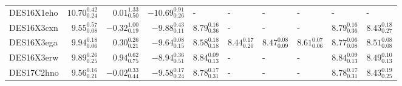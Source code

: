 \documentclass[fleqn,usenatbib,]{mnras}
\begin{document}
\begin{table}
\begin{threeparttable}
\begin{tabular}{lrrrllllll}
DES16X1eho  &  $10.70 _{\scriptscriptstyle 0.24} ^{\scriptscriptstyle 0.42}$ &   $0.01 _{\scriptscriptstyle 0.50} ^{\scriptscriptstyle 1.33}$ &  $-10.69 _{\scriptscriptstyle 0.26} ^{\scriptscriptstyle 0.91}$ &                                                             - &                                                             - &                                                             - &                                                             - &                                                             - &                                                             - \\
DES16X3cxn  &   $9.55 _{\scriptscriptstyle 0.08} ^{\scriptscriptstyle 0.57}$ &  $-0.32 _{\scriptscriptstyle 0.19} ^{\scriptscriptstyle 1.00}$ &   $-9.88 _{\scriptscriptstyle 0.11} ^{\scriptscriptstyle 0.43}$ &  $8.79 _{\scriptscriptstyle 0.36} ^{\scriptscriptstyle 0.16}$ &                                                             - &                                                             - &                                                             - &  $8.79 _{\scriptscriptstyle 0.36} ^{\scriptscriptstyle 0.16}$ &  $8.43 _{\scriptscriptstyle 0.27} ^{\scriptscriptstyle 0.18}$ \\
DES16X3ega  &   $9.94 _{\scriptscriptstyle 0.06} ^{\scriptscriptstyle 0.18}$ &   $0.30 _{\scriptscriptstyle 0.21} ^{\scriptscriptstyle 0.26}$ &   $-9.64 _{\scriptscriptstyle 0.15} ^{\scriptscriptstyle 0.08}$ &  $8.58 _{\scriptscriptstyle 0.18} ^{\scriptscriptstyle 0.18}$ &  $8.44 _{\scriptscriptstyle 0.20} ^{\scriptscriptstyle 0.17}$ &  $8.47 _{\scriptscriptstyle 0.09} ^{\scriptscriptstyle 0.08}$ &  $8.61 _{\scriptscriptstyle 0.06} ^{\scriptscriptstyle 0.07}$ &  $8.77 _{\scriptscriptstyle 0.08} ^{\scriptscriptstyle 0.06}$ &  $8.51 _{\scriptscriptstyle 0.08} ^{\scriptscriptstyle 0.08}$ \\
DES16X3erw  &   $9.89 _{\scriptscriptstyle 0.25} ^{\scriptscriptstyle 0.26}$ &   $0.94 _{\scriptscriptstyle 0.75} ^{\scriptscriptstyle 0.62}$ &   $-8.94 _{\scriptscriptstyle 0.51} ^{\scriptscriptstyle 0.36}$ &  $8.84 _{\scriptscriptstyle 0.13} ^{\scriptscriptstyle 0.09}$ &                                                             - &                                                             - &                                                             - &  $8.84 _{\scriptscriptstyle 0.13} ^{\scriptscriptstyle 0.09}$ &  $8.49 _{\scriptscriptstyle 0.13} ^{\scriptscriptstyle 0.10}$ \\
DES17C2hno  &   $9.56 _{\scriptscriptstyle 0.21} ^{\scriptscriptstyle 0.16}$ &  $-0.02 _{\scriptscriptstyle 0.44} ^{\scriptscriptstyle 0.33}$ &   $-9.58 _{\scriptscriptstyle 0.24} ^{\scriptscriptstyle 0.17}$ &  $8.78 _{\scriptscriptstyle 0.31} ^{\scriptscriptstyle 0.17}$ &                                                             - &                                                             - &                                                             - &  $8.78 _{\scriptscriptstyle 0.31} ^{\scriptscriptstyle 0.17}$ &  $8.43 _{\scriptscriptstyle 0.25} ^{\scriptscriptstyle 0.19}$ \\

\end{tabular}
\end{threeparttable}
\end{table}
\end{document}
